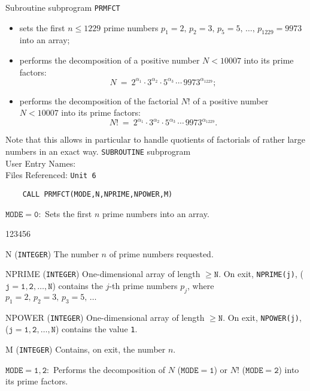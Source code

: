                      
              
\Submitter{}                        
Subroutine subprogram {\tt PRMFCT}
\begin{itemize}
\item sets the first $n \le 1229$ prime numbers
$p_1=2,\,p_2=3,\,p_5=5,\,\ldots,\,p_{1229}=9973$ into an array;
\item performs the decomposition of a positive number $N<10007$ into
its prime factors:
$$N \ = \ 2^{\alpha_1} \cdot 3^{\alpha_2} \cdot 5^{\alpha_3}\,\cdots\,
9973^{\alpha_{1229}};$$
\item performs the decomposition of the factorial $N!$ of
a positive number $N<10007$ into its prime factors:
$$N! \ = \ 2^{\alpha_1} \cdot 3^{\alpha_2} \cdot 5^{\alpha_3}\,\cdots\,
9973^{\alpha_{1229}}.$$
\end{itemize}
Note that this allows in particular to handle quotients of factorials
of rather large numbers in an exact way.
\Structure
{\tt SUBROUTINE} subprogram \\
User Entry  Names:  \\
Files Referenced: {\tt Unit 6}
\Usage
\begin{verbatim}
    CALL PRMFCT(MODE,N,NPRIME,NPOWER,M)
\end{verbatim}
$\mathtt{MODE = 0:}$ Sets the first $n$ prime numbers into an array.
\begin{DLtt}{123456}
\item[N] ({\tt INTEGER}) The number $n$ of prime numbers requested.
\item[NPRIME] ({\tt INTEGER}) One-dimensional array of length
$\mathtt{\ge N}$. On exit, {\tt NPRIME(j)}, ($\mathtt{j=1,2,\ldots,N}$)
contains the $j$-th prime numbers $p_j$,
where $p_1=2,\,p_2=3,\,p_3=5,\,\ldots$
\item[NPOWER] ({\tt INTEGER}) One-dimensional array of length
$\mathtt{\ge N}$. On exit, {\tt NPOWER(j)}, ($\mathtt{j=1,2,\ldots,N}$)
contains the value {\tt 1}.
\item[M] ({\tt INTEGER}) Contains, on exit, the number $n$.
\end{DLtt}
$\mathtt{MODE = 1,2:}$ Performs the decomposition of $N$
($\mathtt{MODE=1}$) or $N!$ ($\mathtt{MODE=2}$) into its prime factors.
